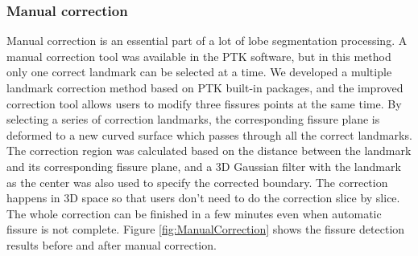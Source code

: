 {\subsubsection{Manual correction}
Manual correction is an essential part of a lot of lobe segmentation processing. A manual correction tool was available in the PTK software, but in this method only one correct landmark can be selected at a time. We developed a multiple landmark correction method based on PTK built-in packages, and the improved correction tool allows users to modify three fissures points at the same time. By selecting a series of correction landmarks, the corresponding fissure plane is deformed to a new curved surface which passes through all the correct landmarks. The correction region was calculated based on the distance between the landmark and its corresponding fissure plane, and a 3D Gaussian filter with the landmark as the center was also used to specify the corrected boundary. The correction happens in 3D space so that users don't need to do the correction slice by slice. The whole correction can be finished in a few minutes even when automatic fissure is not complete. Figure \ref{fig:ManualCorrection} shows the fissure detection results before and after manual correction.

}

